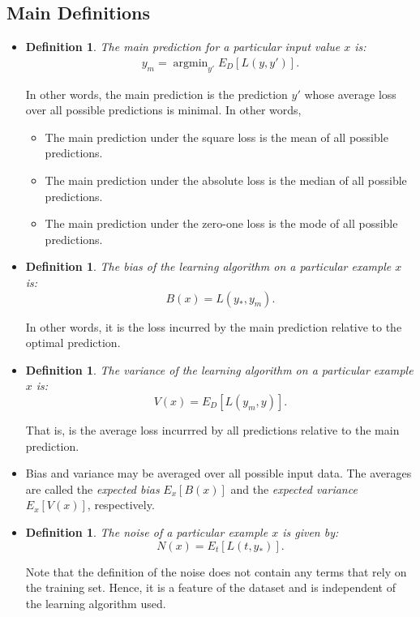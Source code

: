 \documentclass[10pt]{article}
\newtheorem{definition}[lemma]{Definition}
\DeclareMathOperator*{\argmin}{argmin}
\begin{document}
  \subsection{Main Definitions}

  \begin{itemize}
    \item \begin{definition}
      The \emph{main prediction} for a particular input value $x$ is:
      \begin{align*}
        y_m = \argmin_{y'} E_D[L(y,y')].
      \end{align*}      
    \end{definition}
    In other words, the main prediction is the prediction $y'$ whose average loss over all possible predictions is minimal. In other words,
    \begin{itemize}
      \item The main prediction under the square loss is the mean of all possible predictions.
      \item The main prediction under the absolute loss is the median of all possible predictions.
      \item The main prediction under the zero-one loss is the mode of all possible predictions.
    \end{itemize}

    \item \begin{definition}
      The \emph{bias} of the learning algorithm on a particular example $x$ is: $$B(x) = L(y_*, y_m).$$
    \end{definition}
    In other words, it is the loss incurred by the main prediction relative to the optimal prediction.

    \item \begin{definition}
      The \emph{variance} of the learning algorithm on a particular example $x$ is:
      $$ V(x) = E_D[L(y_m, y)].$$
    \end{definition}    
    That is, is the average loss incurrred by all predictions relative to the main prediction.

    \item Bias and variance may be averaged over all possible input data. The averages are called the \emph{expected bias} $E_x[B(x)]$ and the \emph{expected variance} $E_x[V(x)]$, respectively.

    \item \begin{definition}
      The \emph{noise} of a particular example $x$ is given by:
      $$ N(x) = E_t[L(t,y_*)]. $$
    \end{definition}
    Note that the definition of the noise does not contain any terms that rely on the training set. Hence, it is a feature of the dataset and is independent of the learning algorithm used.


\end{itemize}
\end{document}
